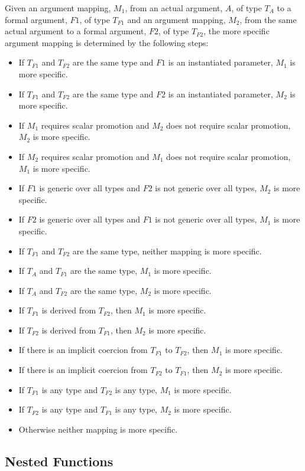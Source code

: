 Given an argument mapping, $M_1$, from an actual argument, $A$, of
type $T_A$ to a formal argument, $F1$, of type $T_{F1}$ and an
argument mapping, $M_2$, from the same actual argument to a formal
argument, $F2$, of type $T_{F2}$, the more specific argument mapping
is determined by the following steps:
\begin{itemize}
\item
 If $T_{F1}$ and $T_{F2}$ are the same type and $F1$ is an
 instantiated parameter, $M_1$ is more specific.
\item
 If $T_{F1}$ and $T_{F2}$ are the same type and $F2$ is an
 instantiated parameter, $M_2$ is more specific.
\item
 If $M_1$ requires scalar promotion and $M_2$ does not require scalar
 promotion, $M_2$ is more specific.
\item
 If $M_2$ requires scalar promotion and $M_1$ does not require scalar
 promotion, $M_1$ is more specific.
\item
 If $F1$ is generic over all types and $F2$ is not generic over all
 types, $M_2$ is more specific.
\item
 If $F2$ is generic over all types and $F1$ is not generic over all
 types, $M_1$ is more specific.
\item
 If $T_{F1}$ and $T_{F2}$ are the same type, neither mapping is more
 specific.
\item
 If $T_A$ and $T_{F1}$ are the same type, $M_1$ is more specific.
\item
 If $T_A$ and $T_{F2}$ are the same type, $M_2$ is more specific.
\item
 If $T_{F1}$ is derived from $T_{F2}$, then $M_1$ is more specific.
\item
 If $T_{F2}$ is derived from $T_{F1}$, then $M_2$ is more specific.
\item
 If there is an implicit coercion from $T_{F1}$ to $T_{F2}$, then
 $M_1$ is more specific.
\item
 If there is an implicit coercion from $T_{F2}$ to $T_{F1}$, then
 $M_2$ is more specific.
\item
 If $T_{F1}$ is any  type and $T_{F2}$ is any 
 type, $M_1$ is more specific.
\item
 If $T_{F2}$ is any  type and $T_{F1}$ is any 
 type, $M_2$ is more specific.
\item
 Otherwise neither mapping is more specific.
\end{itemize}

\subsection{Nested Functions}
\label{Nested_Functions}

